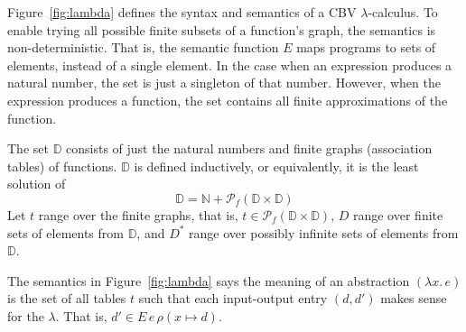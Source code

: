 \documentclass{tufte-handout}
\newcommand{\LAM}[1]{\lambda #1.\,}
\newcommand{\ext}[3]{#3(#1{\mapsto}#2)}
\begin{document}
Figure~\ref{fig:lambda} defines the syntax and semantics of a CBV
$\lambda$-calculus. To enable trying all possible finite subsets of a
function's graph, the semantics is non-deterministic. That is, the
semantic function $E$ maps programs to sets of elements, instead of a
single element. In the case when an expression produces a natural
number, the set is just a singleton of that number. However, when the
expression produces a function, the set contains all finite
approximations of the function.

The set $\mathbb{D}$ consists of just the natural numbers and finite
graphs (association tables) of functions.  $\mathbb{D}$ is defined
inductively, or equivalently, it is the least solution of
\begin{equation}
   \mathbb{D} = \mathbb{N} + \mathcal{P}_f(\mathbb{D} \times \mathbb{D})
  \label{eq:D}
\end{equation}
Let $t$ range over the finite graphs, that is, $t \in
\mathcal{P}_f(\mathbb{D} \times \mathbb{D})$, $D$ range over finite
sets of elements from $\mathbb{D}$, and $D^{*}$ range over possibly
infinite sets of elements from $\mathbb{D}$.

The semantics in Figure~\ref{fig:lambda} says the meaning of an
abstraction $(\LAM{x}e)$ is the set of all tables $t$ such that each
input-output entry $(d,d')$ makes sense for the $\lambda$. That is,
$d' \in E\,e\,\ext{x}{ d}{\rho}$. 
\end{document}
